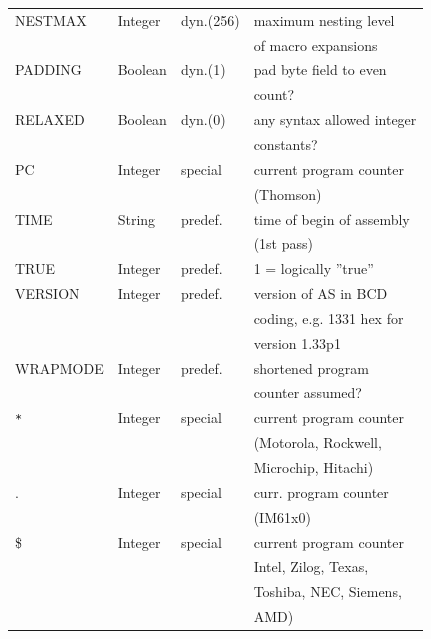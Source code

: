\documentclass[12pt,twoside]{report}
\newcommand{\asname}{{AS}}
\begin{document}
\begin{center}
\begin{longtable}{|l|l|l|l|}
NESTMAX       &  Integer  & dyn.(256)  & maximum nesting level \\
              &           &            & of macro expansions \\
PADDING       & Boolean   & dyn.(1)    & pad byte field to even \\
              &           &            & count? \\
RELAXED       & Boolean   & dyn.(0)    & any syntax allowed integer \\
              &           &            & constants? \\
PC            & Integer   & special    & current program counter \\
              &           &            & (Thomson) \\
TIME          & String    & predef.    & time of begin of assembly \\
              &           &            & (1st pass) \\
TRUE          & Integer   & predef.    & 1 = logically ''true'' \\
VERSION       & Integer   & predef.    & version of \asname{} in BCD \\
	      &  	  &	       & coding, e.g. 1331 hex for \\
              &           &            & version 1.33p1 \\
WRAPMODE      & Integer   & predef.    & shortened program \\
              &           &            & counter assumed? \\
\verb!*!      & Integer   & special    & current program counter \\
              &           &            & (Motorola, Rockwell, \\
              &           &            & Microchip, Hitachi) \\
.             & Integer   & special    & curr. program counter \\
              &           &            & (IM61x0) \\
\$            & Integer   & special    & current program counter \\
              &           &            & Intel, Zilog, Texas, \\
              &           &            & Toshiba, NEC, Siemens, \\
              &           &            & AMD) \\
\hline
\end{longtable}\end{center}
\end{document}
